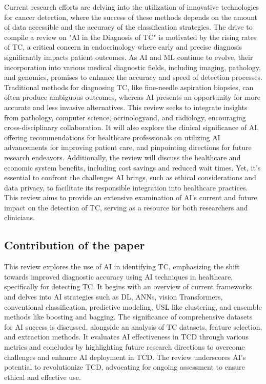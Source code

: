 \documentclass[a4paper,fleqn]{cas-sc}
\begin{document}
Current research efforts are delving into the utilization of innovative technologies for cancer detection, where the success of these methods depends on the amount of data accessible and the accuracy of the classification strategies. The drive to compile a review on "AI in the Diagnosis of \ac{TC}" is motivated by the rising rates of \ac{TC}, a critical concern in endocrinology where early and precise diagnosis significantly impacts patient outcomes. As \ac{AI} and \ac{ML} continue to evolve, their incorporation into various medical diagnostic fields, including imaging, pathology, and genomics, promises to enhance the accuracy and speed of detection processes. Traditional methods for diagnosing \ac{TC}, like fine-needle aspiration biopsies, can often produce ambiguous outcomes, whereas \ac{AI} presents an opportunity for more accurate and less invasive alternatives. This review seeks to integrate insights from  pathology, computer science, ocrinologyand, and  radiology,  encouraging cross-disciplinary collaboration. It will also explore the clinical significance of \ac{AI}, offering recommendations for healthcare professionals on utilizing \ac{AI} advancements for improving patient care, and pinpointing directions for future research endeavors. Additionally, the review will discuss the healthcare and economic system benefits, including cost savings and reduced wait times. Yet, it's essential to confront the challenges \ac{AI} brings, such as ethical considerations and data privacy, to facilitate its responsible integration into healthcare practices. This review aims to provide an extensive examination of \ac{AI}'s current and future impact on the detection of \ac{TC}, serving as a resource for both researchers and clinicians.

\subsection{Contribution of the paper}


This review explores the use of \ac{AI} in identifying \ac{TC}, emphasizing the shift towards improved diagnostic accuracy using \ac{AI} techniques in healthcare, specifically for detecting \ac{TC}. It begins with an overview of current frameworks and delves into \ac{AI} strategies such as \ac{DL}, \acp{ANN}, vision Transformers,  conventional classification, predictive modeling, \ac{USL} like clustering, and ensemble methods like boosting and bagging. The significance of comprehensive datasets for \ac{AI} success is discussed, alongside an analysis of \ac{TC} datasets, feature selection, and extraction methods. It evaluates \ac{AI} effectiveness in  \ac{TCD} through various metrics and concludes by highlighting future research directions to overcome challenges and enhance \ac{AI} deployment in \ac{TCD}. The review underscores \ac{AI}'s potential to revolutionize \ac{TCD}, advocating for ongoing assessment to ensure ethical and effective use.\\
\end{document}
